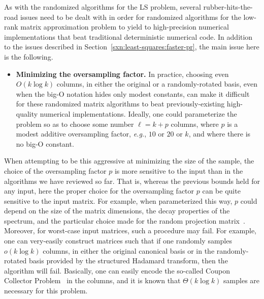 \documentclass[twoside]{article}
\begin{document}
As with the randomized algorithms for the LS problem, several 
rubber-hits-the-road issues need to be dealt with in order for randomized 
algorithms for the low-rank matrix approximation problem to yield to 
high-precision numerical implementations that beat traditional deterministic
numerical code.
In addition to the issues described in 
Section~\ref{sxn:least-squares:faster-pr}, the main issue here is the 
following.
\begin{itemize}
\item
\textbf{Minimizing the oversampling factor.}
In practice, choosing even $O(k \log k)$ columns, in either the original or 
a randomly-rotated basis, even when the big-O notation hides only modest 
constants, can make it difficult for these randomized matrix algorithms to 
beat previously-existing high-quality numerical implementations.
Ideally, one could parameterize the problem so as to choose some number 
$\ell=k+p$ columns, where $p$ is a modest additive oversampling factor, 
\emph{e.g.}, $10$ or $20$ or $k$, and where there is no big-O constant.
\end{itemize}
When attempting to be this aggressive at minimizing the size of the sample, 
the choice of the oversampling factor $p$ is more sensitive to the input
than in the algorithms we have reviewed so far.
That is, whereas the previous bounds held for any input, here the proper 
choice for the oversampling factor $p$ can be quite sensitive to the input
matrix.
For example, when parameterized this way, $p$ could depend on the size of 
the matrix dimensions, the decay properties of the spectrum, and the 
particular choice made for the 
random projection matrix~\cite{MRT11,WLRT08,LWFMRT07,RST09,HMT09_SIREV,HMST10_TR}.
Moreover, for worst-case input matrices, such a procedure may fail.
For example, one can very-easily construct matrices such that if one randomly 
samples $o(k \log k)$ columns, in either the original canonical basis or in 
the randomly-rotated basis provided by the structured Hadamard transform, 
then the algorithm will fail.
Basically, one can easily encode the so-called Coupon 
Collector Problem~\cite{MotwaniRaghavan95} in the columns, and it is known 
that $\Theta( k \log k)$ samples are necessary for this problem.
\end{document}
